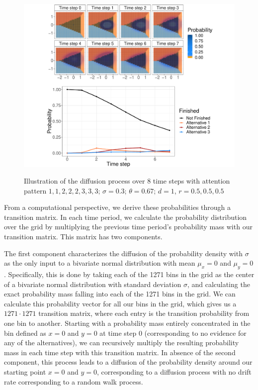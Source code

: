 \documentclass[11pt,a4paper]{article}
\begin{document}
\begin{figure}
\captionsetup{justification=centering}
\caption{Illustration of the diffusion process over 8 time steps with attention pattern $1, 1, 2, 2, 2, 3, 3, 3$; $\sigma = 0.3$; $\theta = 0.67$; $d = 1$, $r = 0.5, 0.5, 0.5$}

\vspace*{12mm}
\centering
\includegraphics[width=1.1\textwidth]{process.pdf}
\label{fig:process}
\end{figure}
\restoregeometry


From a computational perspective, we derive these probabilities through a transition matrix. In each time period, we calculate the probability distribution over the grid by multiplying the previous time period's probability mass with our transition matrix. This matrix has two components. 

The first component characterizes the diffusion of the probability density with $\sigma$ as the only input to a bivariate normal distribution with mean $\mu_x=0$ and $\mu_y=0$. Specifically, this is done by taking each of the 1271 bins in the grid as the center of a bivariate normal distribution with standard deviation $\sigma$, and calculating the exact probability mass falling into each of the 1271 bins in the grid. We can calculate this probability vector for all our bins in the grid, which gives us a $1271\cdot1271$ transition matrix, where each entry is the transition probability from one bin to another. Starting with a probability mass entirely concentrated in the bin defined as $x = 0$ and $y = 0$ at time step 0 (corresponding to no evidence for any of the alternatives), we can recursively multiply the resulting probability mass in each time step with this transition matrix. In absence of the second component, this process leads to a diffusion of the probability density around our starting point $x = 0$ and $y = 0$, corresponding to a diffusion process with no drift rate corresponding to a random walk process. 
\end{document}
